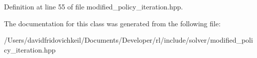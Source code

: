 Definition at line 55 of file modified\+\_\+policy\+\_\+iteration.\+hpp.



The documentation for this class was generated from the following file\+:\begin{DoxyCompactItemize}
\item 
/\+Users/davidfridovichkeil/\+Documents/\+Developer/rl/include/solver/modified\+\_\+policy\+\_\+iteration.\+hpp\end{DoxyCompactItemize}
